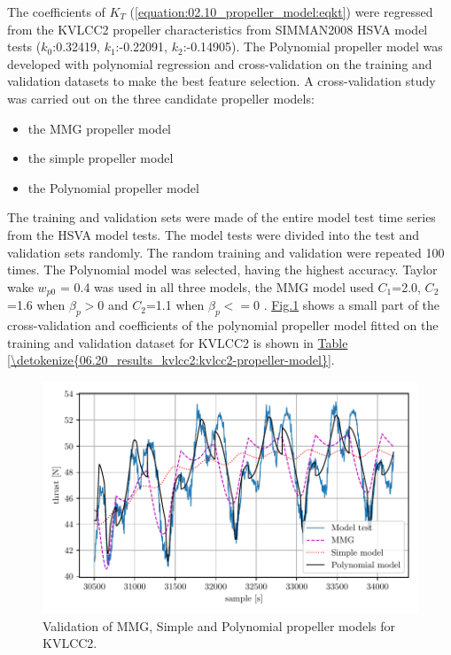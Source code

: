 The coefficients of \(K_T\) (\autoref{equation:02.10_propeller_model:eqkt}) were regressed from the KVLCC2 propeller characteristics from SIMMAN2008 HSVA model tests \cite{stern_experience_2011} (\(k_0\):{0.32419}, \(k_1\):{-0.22091}, \(k_2\):{-0.14905}).
The Polynomial propeller model was developed with polynomial regression and cross-validation on the training and validation datasets to make the best feature selection.
A cross-validation study was carried out on the three candidate propeller models: 
\begin{itemize}
    \item the MMG propeller model
    \item the simple propeller model
    \item the Polynomial propeller model
\end{itemize}
The training and validation sets were made of the entire model test time series from the HSVA model tests. The model tests were divided into the test and validation sets randomly. The random training and validation were repeated 100 times. The Polynomial model was selected, having the highest accuracy. Taylor wake \(w_{p0}\) = {0.4} was used in all three models, the MMG model used \(C_1\)={2.0}, \(C_2\)={1.6} when \(\beta_p>0\) and \(C_2\)={1.1} when \(\beta_p<=0\) \cite{yasukawa_introduction_2015-1}. \hyperref[\detokenize{06.20_results_kvlcc2:fig-propeller-validation}]{Fig.\@ \ref{\detokenize{06.20_results_kvlcc2:fig-propeller-validation}}} shows a small part of the cross-validation and coefficients of the polynomial propeller model fitted on the training and validation dataset for KVLCC2 is shown in \hyperref[\detokenize{06.20_results_kvlcc2:kvlcc2-propeller-model}]{Table \ref{\detokenize{06.20_results_kvlcc2:kvlcc2-propeller-model}}}.

\begin{figure}[!htb]
\centering
\includegraphics{kappa/images/12.pdf}
\caption{Validation of MMG, Simple and Polynomial propeller models for KVLCC2.}\label{\detokenize{06.20_results_kvlcc2:fig-propeller-validation}}\end{figure}


